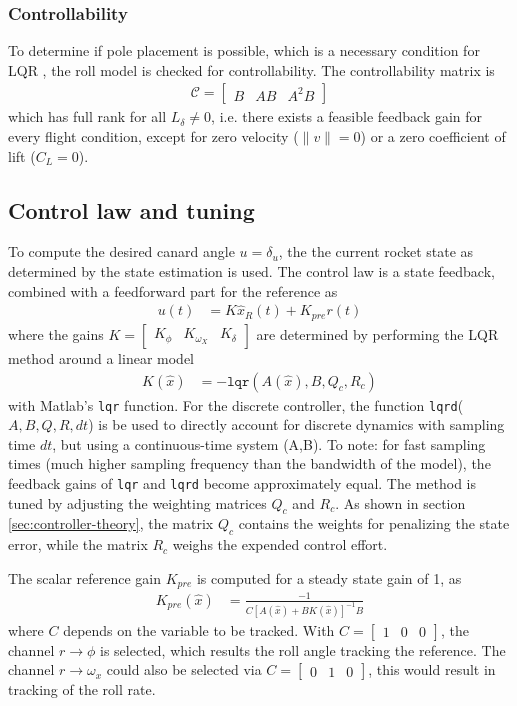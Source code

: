 \subsubsection{Controllability}
To determine if pole placement is possible, which is a necessary condition for LQR \cite{werner2021}, the roll model is checked for controllability.
The controllability matrix is 
\begin{align}
    \mathcal{C} = \begin{bmatrix}
        B & AB & A^2 B 
    \end{bmatrix}
\end{align}
which has full rank for all $L_\delta \neq 0$, i.e. there exists a feasible feedback gain for every flight condition, except for zero velocity ($\lVert v \rVert = 0$) or a zero coefficient of lift ($C_L = 0$).

\subsection{Control law and tuning}
To compute the desired canard angle $u = \delta_u$, the the current rocket state as determined by the state estimation is used.
The control law is a state feedback, combined with a feedforward part for the reference as
\begin{align}
    u(t) &= K \hat x_R(t) + K_{pre} r(t)
\end{align}
where the gains $K = \begin{bmatrix} K_\phi & K_{\omega_X} & K_\delta \end{bmatrix}$ are determined by performing the LQR method around a linear model
\begin{align}
    K(\hat x) &= -\texttt{lqr}(A(\hat x),B,Q_{c},R_{c}) 
\end{align}
with Matlab's \texttt{lqr} function. 
For the discrete controller, the function \texttt{lqrd}($A, B, Q, R, dt$) is be used to directly account for discrete dynamics with sampling time $dt$, but using a continuous-time system (A,B). 
To note: for fast sampling times (much higher sampling frequency than the bandwidth of the model), the feedback gains of \texttt{lqr} and \texttt{lqrd} become approximately equal.
The method is tuned by adjusting the weighting matrices $Q_c$ and $R_c$.
As shown in section \ref{sec:controller-theory}, the matrix $Q_c$ contains the weights for penalizing the state error, while the matrix $R_c$ weighs the expended control effort.

The scalar reference gain $K_{pre}$ is computed for a steady state gain of 1, as
\begin{align}
    K_{pre} (\hat x) &=  \frac{-1}{C \left[ A(\hat x) + B K(\hat x) \right]^{-1} B}
\end{align}
where $C$ depends on the variable to be tracked. 
With $C = \begin{bmatrix} 1 & 0 & 0 \end{bmatrix}$, the channel $r \to \phi$ is selected, which results the roll angle tracking the reference.
The channel $r \to \omega_x$ could also be selected via $C = \begin{bmatrix} 0 & 1 & 0 \end{bmatrix}$, this would result in tracking of the roll rate.

